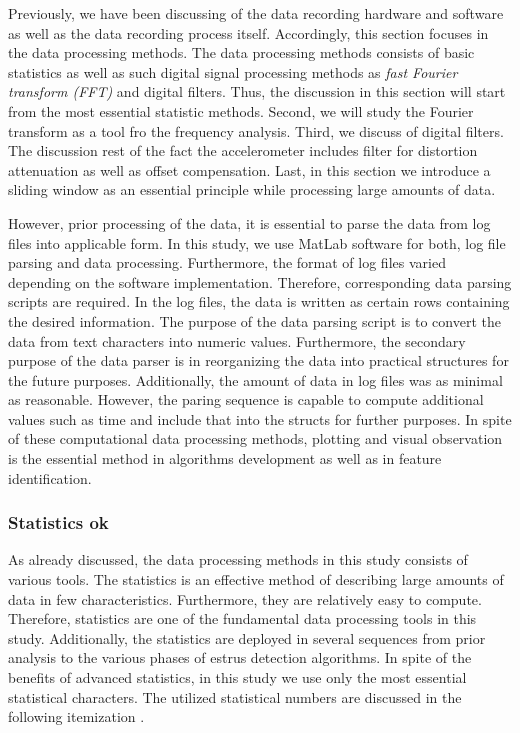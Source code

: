 \documentclass[english,12pt,a4paper,pdftex,elec,utf8]{aaltothesis}
\begin{document}
Previously, we have been discussing of the data recording hardware and software as well as the data recording process itself. Accordingly, this section focuses in the data processing methods. The data processing methods consists of basic statistics as well as such digital signal processing methods as \textit{fast Fourier transform (FFT)} and digital filters. Thus, the discussion in this section will start from the most essential statistic methods. Second, we will study the Fourier transform as a tool fro the frequency analysis. Third, we discuss of digital filters. The discussion rest of the fact the accelerometer includes filter for distortion attenuation as well as offset compensation. Last, in this section we introduce a sliding window as an essential principle while processing large amounts of data.

However, prior processing of the data, it is essential to parse the data from log files into applicable form. In this study, we use MatLab \cite{matlaboverview} software for both, log file parsing and data processing. Furthermore, the format of log files varied depending on the software implementation. Therefore, corresponding data parsing scripts are required. In the log files, the data is written as certain rows containing the desired information. The purpose of the data parsing script is to convert the data from text characters into numeric values. Furthermore, the secondary purpose of the data parser is in reorganizing the data into practical structures for the future purposes. Additionally, the amount of data in log files was as minimal as reasonable. However, the paring sequence is capable to compute additional values such as time and include that into the structs for further purposes. In spite of these computational data processing methods, plotting and visual observation is the essential method in algorithms development as well as in feature identification.

\subsubsection{Statistics ok} \label{statisticssection}

As already discussed, the data processing methods in this study consists of various tools. The statistics is an effective method of describing large amounts of data in few characteristics. Furthermore, they are relatively easy to compute. Therefore, statistics are one of the fundamental data processing tools in this study. Additionally, the statistics are deployed in several sequences from prior analysis to the various phases of estrus detection algorithms. In spite of the benefits of advanced statistics, in this study we use only the most essential statistical characters. The utilized statistical numbers are discussed in the following itemization \cite{maoltaulukotmatematiikka}.
\end{document}
